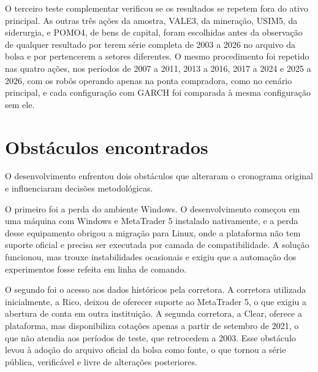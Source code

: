 O terceiro teste complementar verificou se os resultados se repetem fora do ativo
principal. As outras três ações da amostra, VALE3, da mineração, USIM5, da
siderurgia, e POMO4, de bens de capital, foram escolhidas antes da observação de
qualquer resultado por terem série completa de 2003 a 2026 no arquivo da bolsa
e por pertencerem a setores diferentes.
O mesmo procedimento foi repetido nas quatro ações, nos períodos de 2007 a 2011,
2013 a 2016, 2017 a 2024 e 2025 a 2026, com os robôs operando apenas na ponta
compradora, como no cenário principal, e cada configuração com GARCH foi comparada
à mesma configuração sem ele.

\section{Obstáculos encontrados}

O desenvolvimento enfrentou dois obstáculos que alteraram o cronograma original e
influenciaram decisões metodológicas.

O primeiro foi a perda do ambiente Windows. O desenvolvimento começou em uma
máquina com Windows e MetaTrader 5 instalado nativamente, e a perda desse
equipamento obrigou a migração para Linux, onde a plataforma não tem suporte
oficial e precisa ser executada por camada de compatibilidade. A solução funcionou,
mas trouxe instabilidades ocasionais e exigiu que a automação dos experimentos
fosse refeita em linha de comando.

O segundo foi o acesso aos dados históricos pela corretora. A corretora utilizada
inicialmente, a Rico, deixou de oferecer suporte ao MetaTrader 5, o que exigiu a
abertura de conta em outra instituição. A segunda corretora, a Clear, oferece a
plataforma, mas disponibiliza cotações apenas a partir de setembro de 2021, o que
não atendia aos períodos de teste, que retrocedem a 2003. Esse obstáculo levou à
adoção do arquivo oficial da bolsa como fonte, o que tornou a série pública,
verificável e livre de alterações posteriores.
